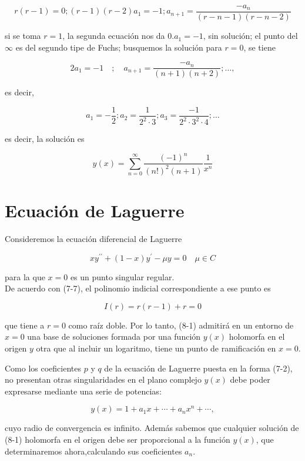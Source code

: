\documentclass[10pt]{article}
\theoremstyle{plain}
\theoremstyle{definition}
\theoremstyle{remark}
\begin{document}
$$
r(r-1)=0 ;(r-1)(r-2) a_{1}=-1 ; a_{n+1}=\frac{-a_{n}}{(r-n-1)(r-n-2)}
$$

si se toma $r=1$, la segunda ecuación nos da $0 . a_{1}=-1$, sin solución; el punto del $\infty$ es del segundo tipe de Fuchs; busquemos la solución para $r=0$, se tiene

$$
2 a_{1}=-1 \quad ; \quad a_{n+1}=\frac{-a_{n}}{(n+1)(n+2)} ; \ldots,
$$

es decir,

$$
a_{1}=-\frac{1}{2} ; a_{2}=\frac{1}{2^{2} \cdot 3} ; a_{3}=\frac{-1}{2^{2} \cdot 3^{2} \cdot 4} ; \ldots
$$

es decir, la solución es

$$
y(x)=\sum_{n=0}^{\infty} \frac{(-1)^{n}}{(n!)^{2}(n+1)} \frac{1}{x^{n}}
$$

\section{Ecuación de Laguerre}
Consideremos la ecuación diferencial de Laguerre


\begin{equation*}
x y^{\prime \prime}+(1-x) y^{\prime}-\mu y=0 \quad \mu \in C \tag{8-1}
\end{equation*}


para la que $x=0$ es un punto singular regular.\\
De acuerdo con (7-7), el polinomio indicial correspondiente a ese punto es

$$
I(r)=r(r-1)+r=0
$$

que tiene a $r=0$ como raíz doble. Por lo tanto, (8-1) admitirá en un entorno de $x=0$ una base de soluciones formada por una función $y(x)$ holomorfa en el origen $y$ otra que al incluir un logaritmo, tiene un punto de ramificación en $x=0$.

Como los coeficientes $p$ y $q$ de la ecuación de Laguerre puesta en la forma (7-2), no presentan otras singularidades en el plano complejo $y(x)$ debe poder expresarse mediante una serie de potencias:


\begin{equation*}
y(x)=1+a_{1} x+\cdots+a_{n} x^{n}+\cdots, \tag{8-2}
\end{equation*}


cuyo radio de convergencia es infinito. Además sabemos que cualquier solución de (8-1) holomorfa en el origen debe ser proporcional a la función $y(x)$, que determinaremos ahora,calculando sus coeficientes $a_{n}$.
\end{document}
